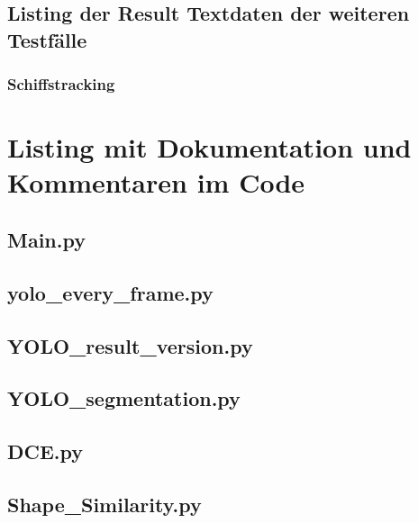 \subsection{Listing der Result Textdaten der weiteren Testfälle}{
    \subsubsection{Schiffstracking}{
        
        
    }

}
\section{Listing mit Dokumentation und Kommentaren im Code}{\label{cd:gesamt_listing}}




\subsection{Main.py}{
    }

\subsection{yolo\_every\_frame.py}{
    }

\subsection{YOLO\_result\_version.py}{
    }

\subsection{YOLO\_segmentation.py}{
    }

\subsection{DCE.py}{
    }

\subsection{Shape\_Similarity.py}{
    
}

